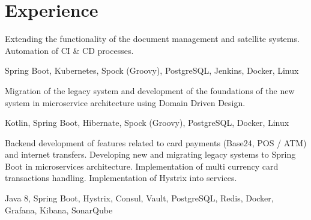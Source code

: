 \documentclass[]{deedy-resume-openfont}
\begin{document}
\begin{minipage}[t]{0.66\textwidth} 


\section{Experience}

Extending the functionality of the document management and satellite systems. Automation of CI & CD processes.

 Spring Boot, Kubernetes, Spock (Groovy), PostgreSQL, Jenkins, Docker, Linux
\sectionsep

Migration of the legacy system and development of the foundations of the new system in microservice architecture using Domain Driven Design.

 Kotlin, Spring Boot, Hibernate, Spock (Groovy), PostgreSQL, Docker, Linux
\sectionsep

Backend development of features related to card payments (Base24, POS / ATM) and internet transfers. 
Developing new and migrating legacy systems to Spring Boot in microservices architecture.
Implementation of multi currency card transactions handling. 
Implementation of Hystrix into services.

 Java 8, Spring Boot, Hystrix, Consul, Vault, PostgreSQL, Redis, Docker, Grafana, Kibana, SonarQube
\sectionsep


\end{minipage}
\end{document}
